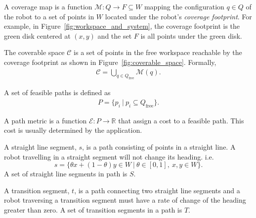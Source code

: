 \documentclass[../main.tex]{subfiles}
\begin{document}
\begin{definition}
A coverage map is a function $\mathcal{M}:Q\to F\subseteq W$ mapping the configuration $q\in Q$ of the robot to a set of points in $W$ located under the robot's \emph{coverage footprint}. For example, in Figure~\ref{fig:workspace_and_system}, the coverage footprint is the green disk centered at $(x,y)$ and the set $F$ is all points under the green disk.
\end{definition}

\begin{definition}
The coverable space $\mathcal{C}$ is a set of points in the free workspace reachable by the coverage footprint as shown in Figure~\ref{fig:coverable_space}. Formally,
	\begin{equation}
	\begin{aligned}
		\mathcal{C}=\bigcup_{q\in Q_{\text{free}}}\mathcal{M}(q).
	\end{aligned}
	\end{equation}
\end{definition}

\begin{definition}
A set of feasible paths is defined as
	\begin{equation}
	\begin{aligned}
		P=\{p_i\ |\ p_i\subseteq Q_{\text{free}}\}.
	\end{aligned}
	\end{equation}
\end{definition}

\begin{definition}
A path metric is a function $\mathcal{E}:P\to\mathbb{R}$ that assign a cost to a feasible path. This cost is usually determined by the application.
\end{definition}

\begin{definition}
A straight line segment, $s$, is a path consisting of points in a straight line. A robot travelling in a straight segment will not change its heading. i.e.
	\begin{equation}
		s=\{\theta x+(1-\theta)y\in W\ |\ \theta\in[0,1],\ x,y\in W\}.
	\end{equation}
A set of straight line segments in path is $S$.
\end{definition}

\begin{definition}
A transition segment, $t$, is a path connecting two straight line segments and a robot traversing a transition segment must have a rate of change of the heading greater than zero. A set of transition segments in a path is $T$.
\end{definition}
\end{document}

